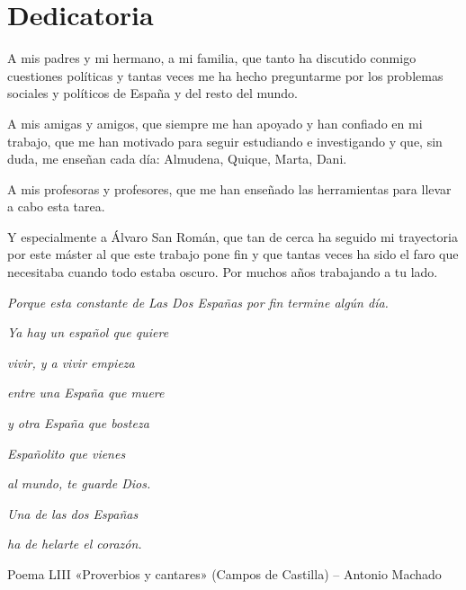 \documentclass[a4paper, svgnames]{article}
\begin{document}
\section*{Dedicatoria}
\setcounter{page}{5}

A mis padres y mi hermano, a mi familia, que tanto ha discutido conmigo cuestiones políticas y tantas veces me ha hecho preguntarme por los problemas sociales y políticos de España y del resto del mundo. 

\noindent
A mis amigas y amigos, que siempre me han apoyado y han confiado en mi trabajo, que me han motivado para seguir estudiando e investigando y que, sin duda, me enseñan cada día: Almudena, Quique, Marta, Dani.

\noindent
A mis profesoras y profesores, que me han enseñado las herramientas para llevar a cabo esta tarea.

\noindent
Y especialmente a Álvaro San Román, que tan de cerca ha seguido mi trayectoria por este máster al que este trabajo pone fin y que tantas veces ha sido el faro que necesitaba cuando todo estaba oscuro. Por muchos años trabajando a tu lado.

\vspace{2cm}

\textit{Porque esta constante de Las Dos Españas por fin termine algún día.}

\text{ }

\begin{flushright}
	\textit{Ya hay un español que quiere}

	\textit{vivir, y a vivir empieza}

	\textit{entre una España que muere}

	\textit{y otra España que bosteza}

	\textit{Españolito que vienes}

	\textit{al mundo, te guarde Dios.}

	\textit{Una de las dos Españas}

	\textit{ha de helarte el corazón.}

	Poema LIII «Proverbios y cantares» (Campos de Castilla) – Antonio Machado
\end{flushright}



\vfill
\newpage %
\thispagestyle{empty}
\mbox{}
\newpage

\tableofcontents

\newpage %
\thispagestyle{empty}
\mbox{}
\end{document}
